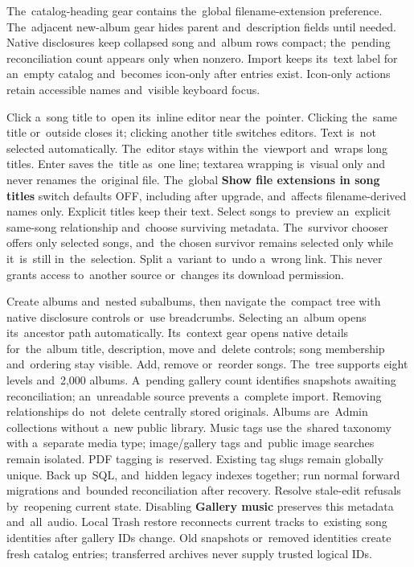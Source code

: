 \documentclass[11pt,a4paper]{article}
\newcommand{\filepath}[1]{\path{#1}}
\newcommand{\ui}[1]{\textbf{#1}}
\begin{document}
The~catalog-heading gear contains the~global filename-extension preference.
The~adjacent new-album gear hides parent and~description fields until needed.
Native disclosures keep collapsed song and~album rows compact; the~pending
reconciliation count appears only when nonzero. Import keeps its~text label for
an~empty catalog and~becomes icon-only after entries exist. Icon-only actions
retain accessible names and~visible keyboard focus.

Click a~song title to~open its~inline editor near the~pointer. Clicking the~same
title or~outside closes it; clicking another title switches editors. Text is~not
selected automatically. The~editor stays within the~viewport and~wraps long
titles. Enter saves the~title as~one line; textarea wrapping is~visual only and
never renames the~original file. The~global
\ui{Show file extensions in song titles} switch defaults OFF, including after
upgrade, and~affects filename-derived names only. Explicit titles keep their
text. Select songs to~preview an~explicit same-song relationship and~choose
surviving metadata. The~survivor chooser offers only selected songs, and~the
chosen survivor remains selected only while it~is~still in~the~selection.
Split a~variant to~undo a~wrong link. This never grants
access to~another source or~changes its download permission.

Create albums and~nested subalbums, then navigate the~compact tree with native
disclosure controls or~use breadcrumbs. Selecting an~album opens its~ancestor
path automatically. Its~context gear opens native details for~the~album title,
description, move and~delete controls; song membership and~ordering stay
visible. Add, remove or~reorder songs. The~tree supports eight levels and~2,000
albums. A~pending gallery count identifies snapshots awaiting
reconciliation; an~unreadable source prevents a~complete import. Removing
relationships do~not~delete centrally stored originals. Albums are~Admin
collections without a~new public
library. Music tags use the~shared taxonomy with a~separate media type;
image/gallery tags and~public image searches remain isolated. PDF tagging
is~reserved. Existing tag slugs remain globally unique. Back up~SQL,
\filepath{data/music/} and~hidden legacy indexes together; run normal forward
migrations and~bounded reconciliation after recovery. Resolve stale-edit
refusals by~reopening current
state. Disabling \ui{Gallery music} preserves this metadata and~all~audio.
Local Trash restore reconnects current tracks to~existing song identities
after gallery IDs change. Old snapshots or~removed identities create fresh
catalog entries; transferred archives never supply trusted logical IDs.
\end{document}
